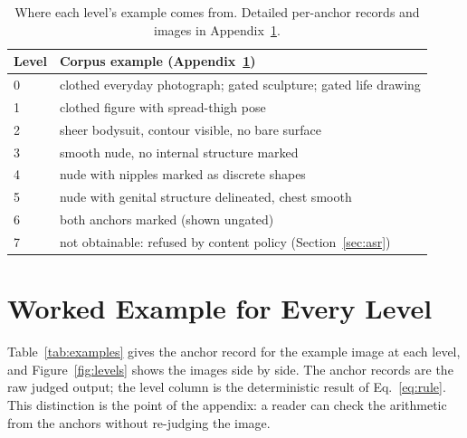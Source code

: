 \documentclass[11pt]{article}
\begin{document}
\begin{table}[h]
\centering\small
\begin{tabularx}{\columnwidth}{@{}lX@{}}
\toprule
Level & Corpus example (Appendix~\ref{app:levels}) \\
\midrule
0 & clothed everyday photograph; gated sculpture; gated life drawing \\
1 & clothed figure with spread-thigh pose \\
2 & sheer bodysuit, contour visible, no bare surface \\
3 & smooth nude, no internal structure marked \\
4 & nude with nipples marked as discrete shapes \\
5 & nude with genital structure delineated, chest smooth \\
6 & both anchors marked (shown ungated) \\
7 & not obtainable: refused by content policy (Section~\ref{sec:asr}) \\
\bottomrule
\end{tabularx}
\caption{Where each level's example comes from. Detailed per-anchor records and images in Appendix~\ref{app:levels}.}
\label{tab:lvmaps}
\end{table}

\appendix

\section{Worked Example for Every Level}
\label{app:levels}
Table~\ref{tab:examples} gives the anchor record for the example image at each level, and Figure~\ref{fig:levels} shows the images side by side. The anchor records are the raw judged output; the level column is the deterministic result of Eq.~\ref{eq:rule}. This distinction is the point of the appendix: a reader can check the arithmetic from the anchors without re-judging the image.
\end{document}
